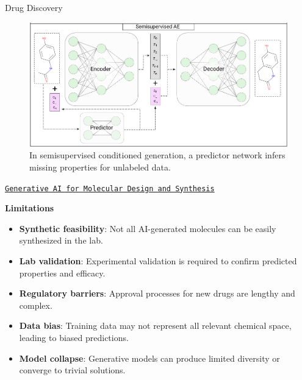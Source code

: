 \begin{frame}[allowframebreaks]{Drug Discovery}
    \begin{figure}
        \centering
        \includegraphics[height=0.75\textheight,width=1\textwidth,keepaspectratio]{images/science/drug-discovery-semisup-ae.png}
        \caption*{In semisupervised conditioned generation, a predictor network infers missing properties for unlabeled data.}
    \end{figure}

    \framebreak

    \begin{center}
        \href{https://www.youtube.com/watch?v=4CHuIyW1oNg}{\texttt{Generative AI for Molecular Design and Synthesis}}
    \end{center}

    \framebreak
    \textbf{Limitations}
    \begin{itemize}
        \item \textbf{Synthetic feasibility}: Not all AI-generated molecules can be easily synthesized in the lab.
        \item \textbf{Lab validation}: Experimental validation is required to confirm predicted properties and efficacy.
        \item \textbf{Regulatory barriers}: Approval processes for new drugs are lengthy and complex.
        \item \textbf{Data bias}: Training data may not represent all relevant chemical space, leading to biased predictions.
        \item \textbf{Model collapse}: Generative models can produce limited diversity or converge to trivial solutions.
    \end{itemize}
\end{frame}
